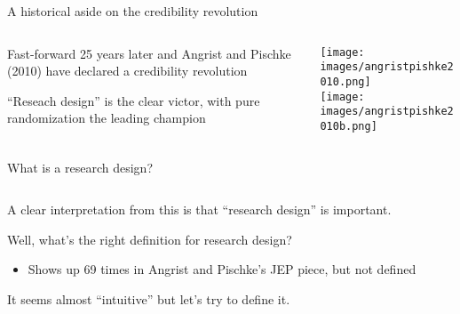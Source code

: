 \documentclass[notes,11pt, aspectratio=169]{beamer}
\newenvironment{wideitemize}{\itemize\addtolength{\itemsep}{10pt}}{\enditemize}
\begin{document}
\begin{frame}{A historical aside on the credibility revolution}
\begin{columns}[T] %
  \begin{column}{.4\textwidth}
    \begin{wideitemize}
    \item Fast-forward 25 years later and Angrist and Pischke (2010) have declared a credibility revolution
    \item ``Reseach design'' is the clear victor, with pure randomization the leading champion
    \end{wideitemize}
\end{column}%
\hfill%
\begin{column}{.6\textwidth}
  \texttt{[image: images/angristpishke2010.png]}\\
  \texttt{[image: images/angristpishke2010b.png]}\\
\end{column}%
\end{columns}
\end{frame}

\begin{frame}{What is a research design?}
\begin{columns}[T] %
  \begin{column}{.7\textwidth}
    \begin{wideitemize}
    \item A clear interpretation from this is that ``research design''
      is important.
    \item Well, what's the right definition for research design?
      \begin{itemize}
      \item Shows up 69 times in Angrist and Pischke's JEP piece, but not defined 
      \end{itemize}
    \item It seems almost ``intuitive'' but let's try to define it.
    \end{wideitemize}
\end{column}%
\hfill%
\begin{column}{.6\textwidth}
\end{column}%
\end{columns}
\end{frame}
\end{document}
